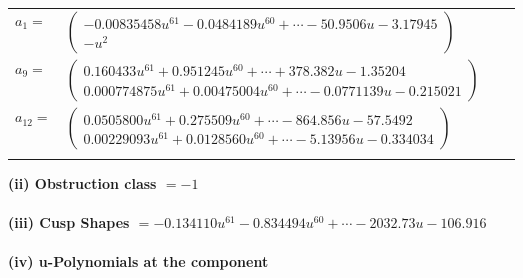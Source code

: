 \documentclass[1p]{elsarticle_modified}
\theoremstyle{definition}
\begin{document}
\begin{tabular}{m{7pt} m{180pt} m{7pt} m{180pt} }
\flushright $a_{1}=$&$\begin{pmatrix}-0.00835458 u^{61}-0.0484189 u^{60}+\cdots-50.9506 u-3.17945\\- u^2\end{pmatrix}$ \\
\flushright $a_{9}=$&$\begin{pmatrix}0.160433 u^{61}+0.951245 u^{60}+\cdots+378.382 u-1.35204\\0.000774875 u^{61}+0.00475004 u^{60}+\cdots-0.0771139 u-0.215021\end{pmatrix}$ \\
\flushright $a_{12}=$&$\begin{pmatrix}0.0505800 u^{61}+0.275509 u^{60}+\cdots-864.856 u-57.5492\\0.00229093 u^{61}+0.0128560 u^{60}+\cdots-5.13956 u-0.334034\end{pmatrix}$\\&\end{tabular}
\flushleft \textbf{(ii) Obstruction class $= -1$}\\~\\
\flushleft \textbf{(iii) Cusp Shapes $= -0.134110 u^{61}-0.834494 u^{60}+\cdots-2032.73 u-106.916$}\\~\\
\newpage\renewcommand{\arraystretch}{1}
\flushleft \textbf{(iv) u-Polynomials at the component}\newline \\
\end{document}
